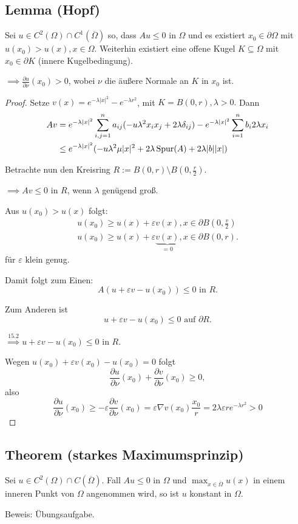 \subsection{Lemma (Hopf)}

Sei $u \in C^2(\Omega)  \cap C^1(\overline\Omega)$ so, dass $A u \leq 0$ in $\Omega$ und es existiert $x_0 \in \partial\Omega$ mit $u(x_0) > u(x), x \in \Omega$.
Weiterhin existiert eine offene Kugel $K \subseteq \Omega$ mit $x_0 \in \partial K$ (innere Kugelbedingung).

$\implies \frac{\partial u}{\partial \nu}(x_0) > 0$, wobei $\nu$ die äußere Normale an $K$ in $x_0$ ist.

\begin{proof}
  Setze $v(x) = e^{-\lambda|x|^2} - e^{-\lambda r^2}$, mit $K = B(0,r), \lambda > 0.$
  Dann
  \begin{align*}
    Av &= e^{-\lambda |x|^2}  \sum_{i,j = 1}^n a_{ij} (- u\lambda^2 x_i x_j + 2 \lambda \delta_{ij}) - e^{- \lambda |x|^2} \sum_{i = 1}^n b_i 2 \lambda x_i \\
    &\leq e^{-\lambda|x|^2} (-u \lambda^2 \mu |x|^2 + 2 \lambda \operatorname{Spur}(A) + 2 \lambda |b||x|)
  \end{align*}

  Betrachte nun den Kreisring $R := B(0,r) \setminus B(0,\frac{r}{2})$.

  $\implies Av \leq 0$ in $R$, wenn $\lambda$ genügend groß.

  Aus $u(x_0) > u(x)$ folgt:
  \begin{align*}
    u(x_0) \geq u(x) + \varepsilon v(x), x \in \partial B(0,\frac{v}{2}) \\
    u(x_0) \geq u(x) + \varepsilon \underbrace{v(x)}_{=0}, x \in \partial B(0,r).
  \end{align*}
  für $\varepsilon$ klein genug.

  Damit folgt zum Einen:
  $$
  A(u + \varepsilon v - u(x_0)) \leq 0 \text{ in } R.
  $$

  Zum Anderen ist
  $$
  u + \varepsilon v - u(x_0) \leq 0 \text{ auf } \partial R.
  $$

  $\overset{\text{15.2}}{\implies} u + \varepsilon v - u(x_0) \leq 0$ in $R$.

  Wegen $u(x_0) + \varepsilon v(x_0) - u(x_0) = 0$ folgt
  $$
  \frac{\partial u}{\partial \nu}(x_0) + \frac{\partial v}{\partial \nu}(x_0) \geq 0,
  $$
  also 
  $$
  \frac{\partial u}{\partial \nu}(x_0) \geq -\varepsilon \frac{\partial v}{\partial \nu}(x_0) = \varepsilon \nabla v(x_0) \frac{x_0}{r} = 2\lambda \varepsilon r e^{-\lambda r^2} > 0
  $$
\end{proof}

\subsection{Theorem (starkes Maximumsprinzip)}

Sei $u \in C^2(\Omega) \cap C(\overline\Omega)$.
Fall $A u \leq 0$ in $\Omega$ und $\max_{x \in \overline\Omega} u(x)$ in einem inneren Punkt von $\Omega$ angenommen wird, so ist $u$ konstant in $\Omega$.

Beweis: Übungsaufgabe.
